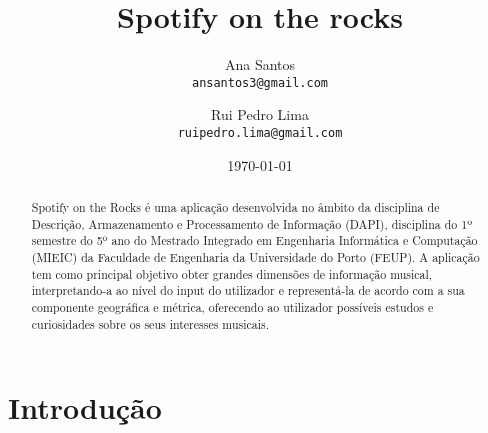\documentclass[twocolumn,twoside,11pt,a4paper]{article}
\title{\vspace{-15mm}\fontsize{24pt}{10pt}\selectfont\textbf{Spotify on the rocks}}
\author{Ana Santos\\
\small \texttt{ansantos3@gmail.com}\\
\and
Rui Pedro Lima\\
\small \texttt{ruipedro.lima@gmail.com}
\vspace{-5mm}
}
\date{\today}
\begin{document}
\maketitle
\thispagestyle{plain}            %


\begin{abstract}


Spotify on the Rocks é uma aplicação desenvolvida no âmbito da disciplina de Descrição,
Armazenamento e Processamento de Informação (DAPI), disciplina do 1º semestre do 5º ano
do Mestrado Integrado em Engenharia Informática e Computação (MIEIC) da Faculdade de
Engenharia da Universidade do Porto (FEUP).
A aplicação tem como principal objetivo obter grandes dimensões de informação musical,
interpretando-a ao nível do input do utilizador e representá-la de acordo com a sua
componente geográfica e métrica, oferecendo ao utilizador possíveis estudos e curiosidades
sobre os seus interesses musicais.

\end{abstract}


\section{Introdução}\label{sec:intro}

\end{document}
